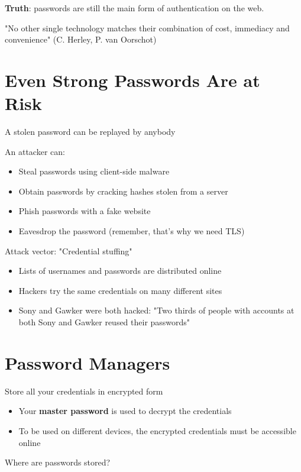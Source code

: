 \documentclass[11pt]{article}
\begin{document}
\textbf{Truth}: passwords are still the main form of authentication on the web. 

"No other single technology matches their combination of cost, immediacy and convenience" (C. Herley, P. van Oorschot)

\section*{Even Strong Passwords Are at Risk}

A stolen password can be replayed by anybody

An attacker can: 

\begin{itemize}
	\item Steal passwords using client-side malware
	\item Obtain passwords by cracking hashes stolen from a server
	\item Phish passwords with a fake website
	\item Eavesdrop the password (remember, that's why we need TLS)
\end{itemize}

Attack vector: "Credential stuffing"

\begin{itemize}
	\item Lists of usernames and passwords are distributed online
	\item Hackers try the same credentials on many different sites
	\item Sony and Gawker were both hacked: "Two thirds of people with accounts at both Sony and Gawker reused their passwords"
\end{itemize}

\section*{Password Managers}

Store all your credentials in encrypted form

\begin{itemize}
	\item Your \textbf{master password} is used to decrypt the credentials
	\item To be used on different devices, the encrypted credentials must be accessible online
\end{itemize}

Where are passwords stored?
\end{document}
